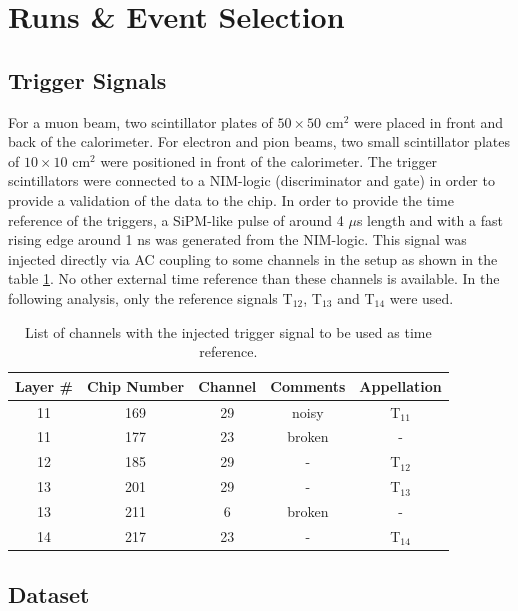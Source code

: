 \section{Runs \& Event Selection}
\label{sec:EvtSelection}

\subsection{Trigger Signals}
\label{subsec:trigger}

For a muon beam, two scintillator plates of $50\times50$ cm$^2$ were placed in front and back of the calorimeter. For electron and pion beams, two small scintillator plates of $10\times10$ cm$^2$ were positioned in front of the calorimeter. The trigger scintillators were connected to a NIM-logic (discriminator and gate) in order to provide a validation of the data to the chip.
In order to provide the time reference of the triggers, a SiPM-like pulse of around 4 $\mu$s length and with a fast rising edge around 1 ns was generated from the NIM-logic. This signal was injected directly via AC coupling to some channels in the setup as shown in the table \ref{table:trigger_signal_list}. No other external time reference than these channels is available. In the following analysis, only the reference signals T$_{12}$,  T$_{13}$ and T$_{14}$ were used.

\begin{table}[htb!]
	\centering
	\caption{List of channels with the injected trigger signal to be used as time reference.}
	\label{table:trigger_signal_list}
	\begin{tabular}{@{} ccccc @{}}
		\hline
		Layer \# & Chip Number & Channel & Comments & Appellation \\
		\hline
		11 & 169 & 29 & noisy & T$_{11}$ \\
		11 & 177 & 23 & broken & - \\
		12 & 185 & 29 & - & T$_{12}$ \\
		13 & 201 & 29 & -  & T$_{13}$ \\
		13 & 211 & 6 & broken & - \\
		14 & 217 & 23 & - & T$_{14}$ \\
		\hline
	\end{tabular}
\end{table}

\subsection{Dataset}
\label{subsec:dataset}

